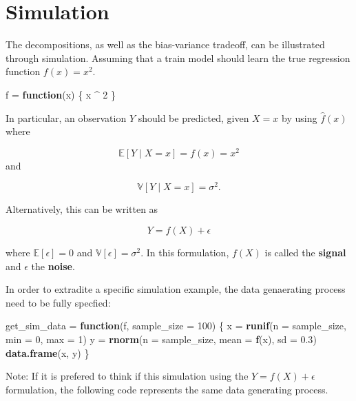 \documentclass[]{report}
\newenvironment{Shaded}{\begin{snugshade}}{\end{snugshade}}
\newcommand{\KeywordTok}[1]{\textcolor[rgb]{0.13,0.29,0.53}{\textbf{#1}}}
\newcommand{\DataTypeTok}[1]{\textcolor[rgb]{0.13,0.29,0.53}{#1}}
\newcommand{\DecValTok}[1]{\textcolor[rgb]{0.00,0.00,0.81}{#1}}
\newcommand{\FloatTok}[1]{\textcolor[rgb]{0.00,0.00,0.81}{#1}}
\newcommand{\StringTok}[1]{\textcolor[rgb]{0.31,0.60,0.02}{#1}}
\newcommand{\ControlFlowTok}[1]{\textcolor[rgb]{0.13,0.29,0.53}{\textbf{#1}}}
\newcommand{\OperatorTok}[1]{\textcolor[rgb]{0.81,0.36,0.00}{\textbf{#1}}}
\newcommand{\NormalTok}[1]{#1}
\begin{document}
\section{Simulation}\label{simulation}

The decompositions, as well as the bias-variance tradeoff, can be
illustrated through simulation. Assuming that a train model should learn
the true regression function \(f(x) = x^2\).

\begin{Shaded}
\begin{Highlighting}[]
\NormalTok{f =}\StringTok{ }\ControlFlowTok{function}\NormalTok{(x) \{}
\NormalTok{  x }\OperatorTok{^}\StringTok{ }\DecValTok{2}
\NormalTok{\}}
\end{Highlighting}
\end{Shaded}

In particular, an observation \(Y\) should be predicted, given \(X = x\)
by using \(\hat{f}(x)\) where

\[
\mathbb{E}[Y \mid X = x] = f(x) = x^2
\] and

\[
\mathbb{V}[Y \mid X = x] = \sigma ^ 2.
\]

Alternatively, this can be written as

\[
Y = f(X) + \epsilon
\]

where \(\mathbb{E}[\epsilon] = 0\) and
\(\mathbb{V}[\epsilon] = \sigma ^ 2\). In this formulation, \(f(X)\) is
called the \textbf{signal} and \(\epsilon\) the \textbf{noise}.

In order to extradite a specific simulation example, the data
genaerating process need to be fully specfied:

\begin{Shaded}
\begin{Highlighting}[]
\NormalTok{get_sim_data =}\StringTok{ }\ControlFlowTok{function}\NormalTok{(f, }\DataTypeTok{sample_size =} \DecValTok{100}\NormalTok{) \{}
\NormalTok{  x =}\StringTok{ }\KeywordTok{runif}\NormalTok{(}\DataTypeTok{n =}\NormalTok{ sample_size, }\DataTypeTok{min =} \DecValTok{0}\NormalTok{, }\DataTypeTok{max =} \DecValTok{1}\NormalTok{)}
\NormalTok{  y =}\StringTok{ }\KeywordTok{rnorm}\NormalTok{(}\DataTypeTok{n =}\NormalTok{ sample_size, }\DataTypeTok{mean =} \KeywordTok{f}\NormalTok{(x), }\DataTypeTok{sd =} \FloatTok{0.3}\NormalTok{)}
  \KeywordTok{data.frame}\NormalTok{(x, y)}
\NormalTok{\}}
\end{Highlighting}
\end{Shaded}

Note: If it is prefered to think if this simulation using the
\(Y = f(X) + \epsilon\) formulation, the following code represents the
same data generating process.
\end{document}
